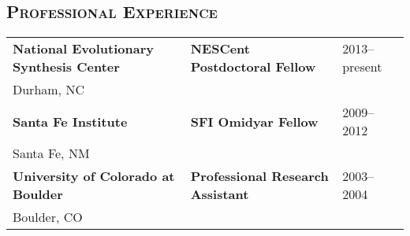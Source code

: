 \documentclass[centered,overlapped,line]{res}
\begin{document}
\begin{resume}
  \section{\bf \large \scshape Professional Experience}
  \vspace{1ex}
  \begin{tabular}{@{}p{2.5in}@{}p{2in}l}
    \bfseries National Evolutionary Synthesis Center & \textbf{NESCent Postdoctoral Fellow} & 2013--present \\
    \hspace{0.5in} Durham, NC & & \\[2ex]

    \bfseries Santa Fe Institute & \textbf{SFI Omidyar Fellow} & 2009--2012 \\
    \hspace{0.5in} Santa Fe, NM &  & \\[2ex]

    \bfseries University of Colorado at Boulder & \textbf{Professional Research Assistant} & 2003--2004 \\
    \hspace{0.5in} Boulder, CO & &
  \end{tabular}




\end{resume}
\end{document}
